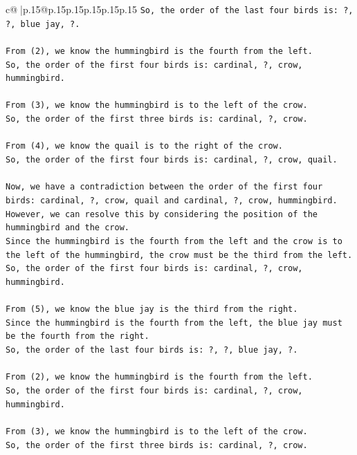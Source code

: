 \documentclass{article}
\begin{document}
{\begin{supertabular}{c@{$\;$}|p{.15\linewidth}@{}p{.15\linewidth}p{.15\linewidth}p{.15\linewidth}p{.15\linewidth}p{.15\linewidth}}
{{{\texttt{So, the order of the last four birds is: ?, ?, blue jay, ?.} \\
\\ 
\texttt{From (2), we know the hummingbird is the fourth from the left. } \\
\texttt{So, the order of the first four birds is: cardinal, ?, crow, hummingbird.} \\
\\ 
\texttt{From (3), we know the hummingbird is to the left of the crow. } \\
\texttt{So, the order of the first three birds is: cardinal, ?, crow.} \\
\\ 
\texttt{From (4), we know the quail is to the right of the crow. } \\
\texttt{So, the order of the first four birds is: cardinal, ?, crow, quail.} \\
\\ 
\texttt{Now, we have a contradiction between the order of the first four birds: cardinal, ?, crow, quail and cardinal, ?, crow, hummingbird. } \\
\texttt{However, we can resolve this by considering the position of the hummingbird and the crow. } \\
\texttt{Since the hummingbird is the fourth from the left and the crow is to the left of the hummingbird, the crow must be the third from the left. } \\
\texttt{So, the order of the first four birds is: cardinal, ?, crow, hummingbird.} \\
\\ 
\texttt{From (5), we know the blue jay is the third from the right. } \\
\texttt{Since the hummingbird is the fourth from the left, the blue jay must be the fourth from the right. } \\
\texttt{So, the order of the last four birds is: ?, ?, blue jay, ?.} \\
\\ 
\texttt{From (2), we know the hummingbird is the fourth from the left. } \\
\texttt{So, the order of the first four birds is: cardinal, ?, crow, hummingbird.} \\
\\ 
\texttt{From (3), we know the hummingbird is to the left of the crow. } \\
\texttt{So, the order of the first three birds is: cardinal, ?, crow.} \\
}}}
\end{supertabular}}
\end{document}
